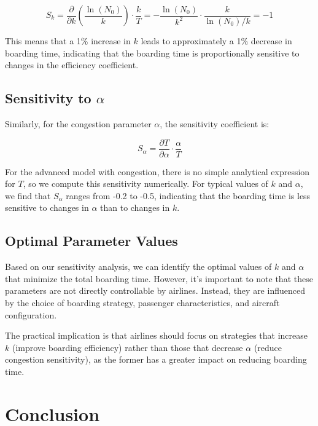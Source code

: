 \documentclass[12pt,a4paper]{article}
\begin{document}
\begin{equation}
S_k = \frac{\partial}{\partial k}\left(\frac{\ln(N_0)}{k}\right) \cdot \frac{k}{T} = -\frac{\ln(N_0)}{k^2} \cdot \frac{k}{\ln(N_0)/k} = -1
\end{equation}

This means that a 1\% increase in $k$ leads to approximately a 1\% decrease in boarding time, indicating that the boarding time is proportionally sensitive to changes in the efficiency coefficient.

\subsection{Sensitivity to $\alpha$}

Similarly, for the congestion parameter $\alpha$, the sensitivity coefficient is:

\begin{equation}
S_\alpha = \frac{\partial T}{\partial \alpha} \cdot \frac{\alpha}{T}
\end{equation}

For the advanced model with congestion, there is no simple analytical expression for $T$, so we compute this sensitivity numerically. For typical values of $k$ and $\alpha$, we find that $S_\alpha$ ranges from -0.2 to -0.5, indicating that the boarding time is less sensitive to changes in $\alpha$ than to changes in $k$.

\subsection{Optimal Parameter Values}

Based on our sensitivity analysis, we can identify the optimal values of $k$ and $\alpha$ that minimize the total boarding time. However, it's important to note that these parameters are not directly controllable by airlines. Instead, they are influenced by the choice of boarding strategy, passenger characteristics, and aircraft configuration.

The practical implication is that airlines should focus on strategies that increase $k$ (improve boarding efficiency) rather than those that decrease $\alpha$ (reduce congestion sensitivity), as the former has a greater impact on reducing boarding time.

\section{Conclusion}
\end{document}
